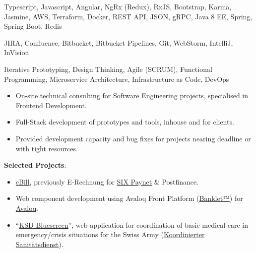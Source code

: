 \medskip
\begin{description}
	\ifincludestech
	\item [Technologies] Typescript, Javascript, Angular, NgRx (Redux), RxJS, Bootstrap, Karma, Jasmine, AWS, Terraform, Docker, REST API, JSON, gRPC, Java 8 EE, Spring, Spring Boot, Redis
	\fi
	\ifincludestools
	\item [Tools] JIRA, Confluence, Bitbucket, Bitbucket Pipelines, Git, WebStorm, IntelliJ, InVision
	\fi
	\ifincludesmethods
	\item [Methodologies] Iterative Prototyping, Design Thinking, Agile (SCRUM), Functional Programming, Microservice Architecture, Infrastructure as Code, DevOps
	\fi
\end{description}

\divider


\medskip
\begin{itemize}
	\item On-site technical consulting for Software Engineering projects, specialised in Frontend Development.
	\item Full-Stack development of prototypes and tools, inhouse and for clients.
	\item Provided development capacity and bug fixes for projects nearing deadline or with tight resources.
\end{itemize}

\ifincludesselectedprojects
	\smallskip
	\textbf{Selected Projects}:
	\smallskip
	\begin{itemize}
		\item \href{https://www.ebill.ch/}{eBill}, previously E-Rechnung for \href{https://www.six-group.com/en/site/banking-services/paynet.html}{SIX Paynet} \& Postfinance.
		\item Web component development using Avaloq Front Platform (\href{https://developer.avaloq.com/web/developer-portal/learn}{Banklet™}) for \href{https://www.avaloq.com/en/}{Avaloq}.
		\item \enquote{\href{https://blog.alertswiss.ch/de/rubriken/bevoelkerungsschutz/koordinierter-sanitaetsdienst-ksd-neues-management-tool-blue-screen-switzerland/}{KSD Bluescreen}}, web application for coordination of basic medical care in emergency/crisis situations for the Swiss Army (\href{https://www.vtg.admin.ch/de/organisation/astab/san/ksd.html}{Koordinierter Sanitätsdienst}).
	\end{itemize}
\fi

